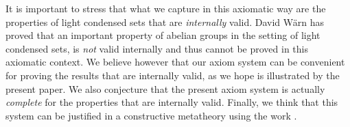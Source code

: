 It is important to stress that what we capture in this axiomatic way are the properties of light condensed
sets that are {\em internally} valid. David W\"arn \cite{warn2024} has proved that an important property of abelian
groups in the setting of light condensed sets, is {\em not} valid internally and thus cannot be proved in this axiomatic context.
We believe however that our axiom system can be convenient for proving the results that are internally valid, as we hope
is illustrated by the present paper. We also conjecture that the present axiom system is actually {\em complete}
for the properties that are internally valid. Finally, we think that this system can be justified in a constructive metatheory
using the work \cite{CRS21}.
